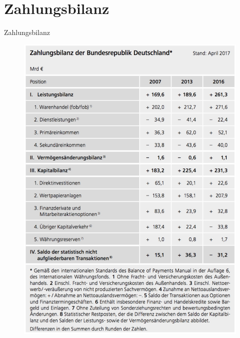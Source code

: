 \documentclass[10pt,a4paper, ngerman]{beamer}
\begin{document}
\section{Zahlungsbilanz}
\begin{frame}{Zahlungsbilanz}
\begin{figure}
\centering
\includegraphics[height=0.9\textheight]{zahlungsbilanz_de}
\end{figure}

\end{frame}
\end{document}

